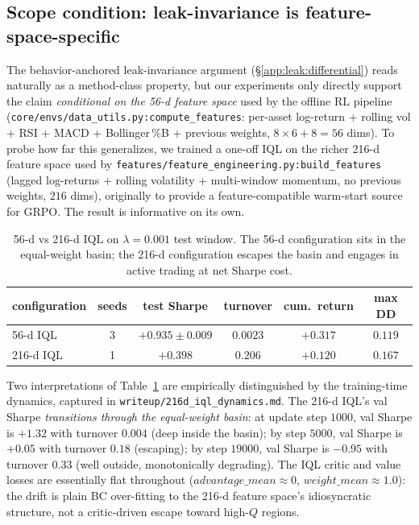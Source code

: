 \subsection{Scope condition: leak-invariance is feature-space-specific}
\label{app:leak:scope}

The behavior-anchored leak-invariance argument
(\S\ref{app:leak:differential}) reads naturally as a method-class
property, but our experiments only directly support the claim
\emph{conditional on the 56-d feature space} used by the offline RL
pipeline (\texttt{core/envs/data\_utils.py:compute\_features}: per-asset
log-return + rolling vol + RSI + MACD + Bollinger\,\%B + previous
weights, $8 \times 6 + 8 = 56$ dims). To probe how far this generalizes,
we trained a one-off IQL on the richer 216-d feature space used by
\texttt{features/feature\_engineering.py:build\_features} (lagged
log-returns + rolling volatility + multi-window momentum, no previous
weights, $216$ dims), originally to provide a feature-compatible
warm-start source for GRPO. The result is informative on its own.

\begin{table}[t]
\centering
\caption{56-d vs 216-d IQL on $\lambda{=}0.001$ test window. The 56-d
configuration sits in the equal-weight basin; the 216-d configuration
escapes the basin and engages in active trading at net Sharpe cost.}
\label{tab:scope-condition}
\small
\begin{tabular}{lccccc}
\toprule
configuration & seeds & test Sharpe          & turnover & cum.\ return & max DD \\
\midrule
56-d IQL  & 3 & $+0.935 \pm 0.009$  & $0.0023$ & $+0.317$ & $0.119$ \\
216-d IQL & 1 & $+0.398$            & $0.206$  & $+0.120$ & $0.167$ \\
\bottomrule
\end{tabular}
\end{table}

Two interpretations of Table~\ref{tab:scope-condition} are
empirically distinguished by the training-time dynamics, captured in
\texttt{writeup/216d\_iql\_dynamics.md}. The 216-d IQL's val Sharpe
\emph{transitions through the equal-weight basin}: at update step
$1000$, val Sharpe is $+1.32$ with turnover $0.004$ (deep inside the
basin); by step $5000$, val Sharpe is $+0.05$ with turnover $0.18$
(escaping); by step $19000$, val Sharpe is $-0.95$ with turnover
$0.33$ (well outside, monotonically degrading). The IQL critic and
value losses are essentially flat throughout
($\mathit{advantage\_mean} \approx 0$, $\mathit{weight\_mean} \approx
1.0$): the drift is plain BC over-fitting to the 216-d feature space's
idiosyncratic structure, not a critic-driven escape toward high-$Q$
regions.

